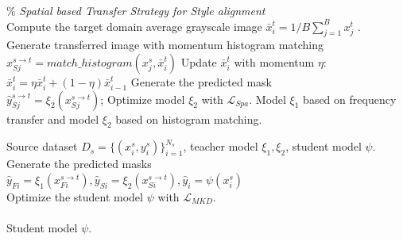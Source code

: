 \documentclass[letterpaper]{article} %
\begin{document}
\begin{algorithm}[!h]
\begin{algorithmic}[1]
        
        \% \textit{Spatial based Transfer Strategy for Style alignment}\\
                \STATE Compute the target domain average grayscale image $\bar{x}_i^t  =1/B \sum_{j=1}^B x_j^t$ .\\
                    \STATE Generate transferred image with momentum histogram matching \\
                    $x_{Sj}^{s \to t}= match\_histogram(x_j^s,\bar{x}_i^t )$
                        \STATE Update $\bar{x}_i^t$ with momentum $\eta $:\\
                          $\bar{x}_i^t=\eta \bar{x}_i^t +(1-\eta) \bar{x}_{i-1}^t$
                    \ENDIF
                    \STATE Generate the predicted mask \\
                    $\hat{y}_{Sj}^{s\to t}=\xi_2 (x_{Sj}^{s \to t} )$;
                    \STATE Optimize model $\xi_2$ with $\mathcal{L}_{Spa}$.
                \ENDFOR
            \ENDFOR
        \ENDFOR
        \ENSURE Model $\xi_1$ based on frequency transfer and model $\xi_2$ based on histogram matching.
	\end{algorithmic}  
\end{algorithm}

\begin{algorithm}[!h]
	\renewcommand{\algorithmicrequire}{\textbf{Require:}}
	\renewcommand{\algorithmicensure}{\textbf{Output:}}
	\caption{Training process of multi-teacher distillation.}
	\label{alg2}
	\begin{algorithmic}[1]
        \REQUIRE Source dataset $D_s=\{(x_i^s,y_i^s)\}_{i=1}^{N_s}$, teacher model $\xi_1, \xi_2$, student model $\psi $. \\

                \STATE Generate the predicted masks \\
                $\hat{y}_{Fi}=\xi_1 (x_{Fi}^{s \to t} ),\hat{y}_{Si}=\xi_2 (x_{Si}^{s \to t} ), 
                \hat{y}_{i}=\psi (x_{i}^{s} )$\\ 
                \STATE Optimize the student model $\psi$ with $\mathcal{L}_{MKD}$. \\
            \ENDFOR
        \ENDFOR \\

        \ENSURE Student model $\psi$. 
	\end{algorithmic}  
\end{algorithm}
\end{document}
